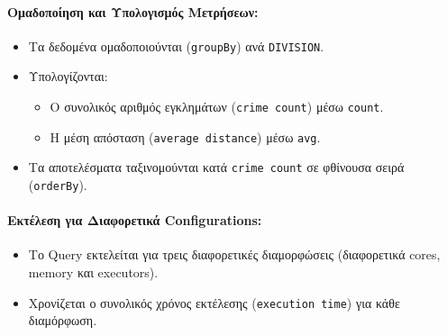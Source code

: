 \documentclass{article}
\begin{document}
\paragraph{Ομαδοποίηση και Υπολογισμός Μετρήσεων:}
\begin{itemize}
    \item Τα δεδομένα ομαδοποιούνται (\texttt{groupBy}) ανά \texttt{DIVISION}.
    \item Υπολογίζονται:
        \begin{itemize}
            \item Ο συνολικός αριθμός εγκλημάτων (\texttt{crime count}) μέσω \texttt{count}.
            \item Η μέση απόσταση (\texttt{average distance}) μέσω \texttt{avg}.
        \end{itemize}
    \item Τα αποτελέσματα ταξινομούνται κατά \texttt{crime count} σε φθίνουσα σειρά (\texttt{orderBy}).
\end{itemize}

\paragraph{Εκτέλεση για Διαφορετικά Configurations:}
\begin{itemize}
    \item Το Query εκτελείται για τρεις διαφορετικές διαμορφώσεις (διαφορετικά cores, memory και executors).
    \item Χρονίζεται ο συνολικός χρόνος εκτέλεσης (\texttt{execution time}) για κάθε διαμόρφωση.
\end{itemize}
\end{document}
